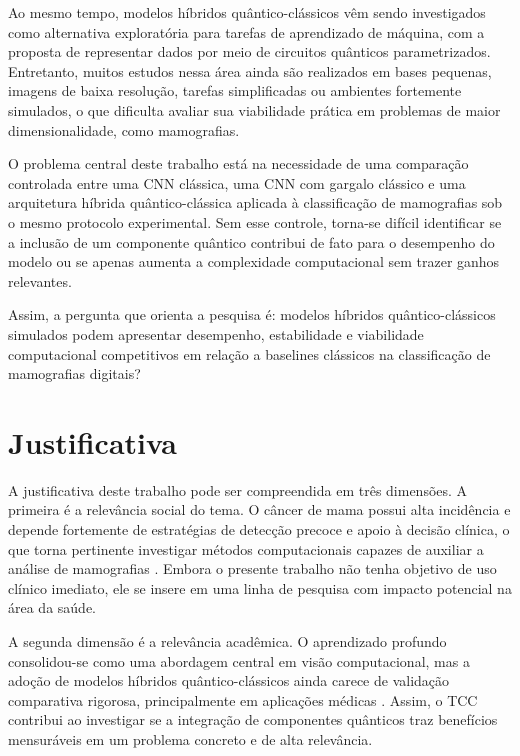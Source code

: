 \documentclass[
    12pt,
    openright,
    oneside,
    a4paper,
    english,
    brazil
]{abntex2}
\begin{document}
Ao mesmo tempo, modelos híbridos quântico-clássicos vêm sendo investigados como alternativa exploratória para tarefas de aprendizado de máquina, com a proposta de representar dados por meio de circuitos quânticos parametrizados. Entretanto, muitos estudos nessa área ainda são realizados em bases pequenas, imagens de baixa resolução, tarefas simplificadas ou ambientes fortemente simulados, o que dificulta avaliar sua viabilidade prática em problemas de maior dimensionalidade, como mamografias.

O problema central deste trabalho está na necessidade de uma comparação controlada entre uma CNN clássica, uma CNN com gargalo clássico e uma arquitetura híbrida quântico-clássica aplicada à classificação de mamografias sob o mesmo protocolo experimental. Sem esse controle, torna-se difícil identificar se a inclusão de um componente quântico contribui de fato para o desempenho do modelo ou se apenas aumenta a complexidade computacional sem trazer ganhos relevantes.

Assim, a pergunta que orienta a pesquisa é: modelos híbridos quântico-clássicos simulados podem apresentar desempenho, estabilidade e viabilidade computacional competitivos em relação a baselines clássicos na classificação de mamografias digitais?

\section{Justificativa}

A justificativa deste trabalho pode ser compreendida em três dimensões. A primeira é a relevância social do tema. O câncer de mama possui alta incidência e depende fortemente de estratégias de detecção precoce e apoio à decisão clínica, o que torna pertinente investigar métodos computacionais capazes de auxiliar a análise de mamografias \cite{WHO2026BreastCancer}. Embora o presente trabalho não tenha objetivo de uso clínico imediato, ele se insere em uma linha de pesquisa com impacto potencial na área da saúde.

A segunda dimensão é a relevância acadêmica. O aprendizado profundo consolidou-se como uma abordagem central em visão computacional, mas a adoção de modelos híbridos quântico-clássicos ainda carece de validação comparativa rigorosa, principalmente em aplicações médicas \cite{LeCun2015,Gupta2025QMLDigitalHealth}. Assim, o TCC contribui ao investigar se a integração de componentes quânticos traz benefícios mensuráveis em um problema concreto e de alta relevância.
\end{document}
